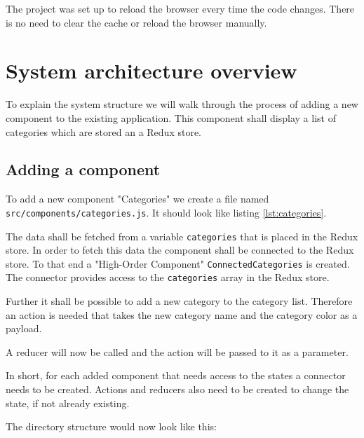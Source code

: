 The project was set up to reload the browser every time 
the code changes. There is no need to clear the cache or reload the browser manually.

\section{System architecture overview}

To explain the system structure we will walk through the process of adding a new component to the existing application. This component shall display a list of categories which are stored an a Redux store.

\subsection{Adding a component}
To add a new component "Categories" we create a file 
named \texttt{src/components/categories.js}. It should look
like listing \ref{lst:categories}.



The data  shall be fetched from a variable 
\texttt{categories} that is
placed in the Redux store.
In order to fetch this data the component shall be connected to the Redux store. To that end a "High-Order Component" \texttt{ConnectedCategories} is created.
The connector provides access to the \texttt{categories} array in the Redux store.



Further it shall be possible to add a new category to the category list. Therefore an action is needed that takes the new category name and the category color as a payload.



A reducer will now be called and the action will be passed to it as a parameter.




In short, for each added component that needs access to the states a connector needs to be created. Actions and reducers also need to be created to change the state, if not already existing.

The directory structure would now look like this:



